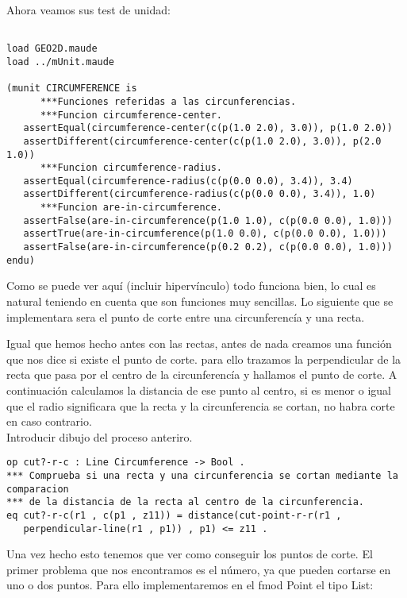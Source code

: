 \documentclass[12pt,a4paper]{book}
\begin{document}
Ahora veamos sus test de unidad:

\begin{verbatim}

load GEO2D.maude
load ../mUnit.maude

(munit CIRCUMFERENCE is 
      ***Funciones referidas a las circunferencias.
      ***Funcion circumference-center.
   assertEqual(circumference-center(c(p(1.0 2.0), 3.0)), p(1.0 2.0))
   assertDifferent(circumference-center(c(p(1.0 2.0), 3.0)), p(2.0 1.0))
      ***Funcion circumference-radius.
   assertEqual(circumference-radius(c(p(0.0 0.0), 3.4)), 3.4)
   assertDifferent(circumference-radius(c(p(0.0 0.0), 3.4)), 1.0)
      ***Funcion are-in-circumference.
   assertFalse(are-in-circumference(p(1.0 1.0), c(p(0.0 0.0), 1.0)))
   assertTrue(are-in-circumference(p(1.0 0.0), c(p(0.0 0.0), 1.0)))
   assertFalse(are-in-circumference(p(0.2 0.2), c(p(0.0 0.0), 1.0)))	
endu)
\end{verbatim}

Como se puede ver aqu\'i (incluir hiperv\'inculo) todo funciona bien, lo cual es natural teniendo en cuenta que son funciones muy sencillas. Lo siguiente que se implementara sera el punto de corte entre una circunferenc\'ia y una recta.

Igual que hemos hecho antes con las rectas, antes de nada creamos una funci\'on que nos dice si existe el punto de corte. para ello trazamos la perpendicular de la recta que pasa por el centro de la circunferenc\'ia y hallamos el punto de corte. A continuaci\'on calculamos la distancia de ese punto al centro, si es menor o igual que el radio significara que la recta y la circunferencia se cortan, no habra corte en caso contrario.\\

Introducir dibujo del proceso anteriro.\par
\begin{verbatim}
op cut?-r-c : Line Circumference -> Bool .
*** Comprueba si una recta y una circunferencia se cortan mediante la comparacion 
*** de la distancia de la recta al centro de la circunferencia.
eq cut?-r-c(r1 , c(p1 , z11)) = distance(cut-point-r-r(r1 , 
   perpendicular-line(r1 , p1)) , p1) <= z11 .
\end{verbatim}

Una vez hecho esto tenemos que ver como conseguir los puntos de corte. El primer problema que nos encontramos es el n\'umero, ya que pueden cortarse en uno o dos puntos. Para ello implementaremos en el fmod Point el tipo List:
\end{document}
